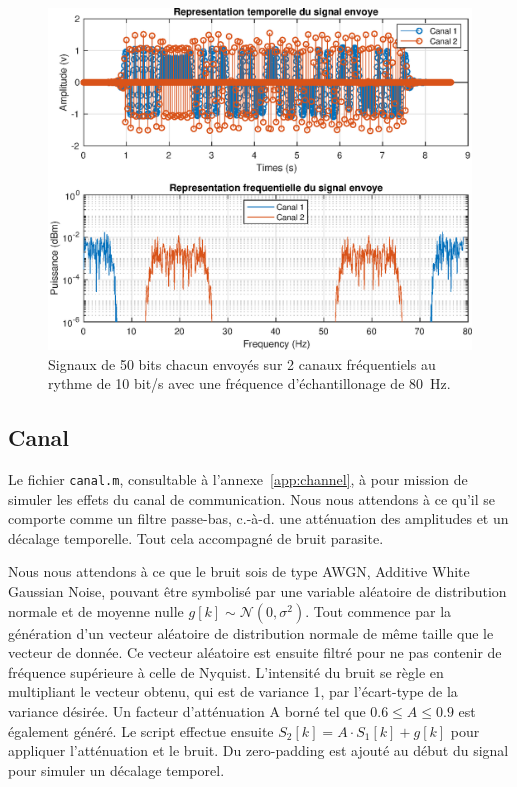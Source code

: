 \documentclass[10pt, oneside, a4paper]{article}
\begin{document}
\begin{figure}[p]
	\centering
	\includegraphics[height=0.45\textheight]{eps/sender.eps}
	\caption{Signaux de 50 bits chacun envoyés sur 2 canaux fréquentiels au rythme de 10 bit/s
			 avec une fréquence d'échantillonage de \SI{80}{\hertz}.}
	\label{fig:sender}
\end{figure}

\subsection{Canal}
Le fichier \texttt{canal.m}, consultable à l'annexe~\ref{app:channel}, à pour mission de simuler les effets du canal de communication.
Nous nous attendons à ce qu'il se comporte comme un filtre passe-bas, c.-à-d. une atténuation des amplitudes et un décalage temporelle.
Tout cela accompagné de bruit parasite.

Nous nous attendons à ce que le bruit sois de type AWGN, Additive White Gaussian Noise, pouvant être symbolisé par une variable aléatoire de distribution normale et de moyenne nulle $g[k]\sim\mathcal{N}(0,\sigma^2)$.
Tout commence par la génération d'un vecteur aléatoire de distribution normale de même taille que le vecteur de donnée.
Ce vecteur aléatoire est ensuite filtré pour ne pas contenir de fréquence supérieure à celle de Nyquist.
L'intensité du bruit se règle en multipliant le vecteur obtenu, qui est de variance 1, par l'écart-type de la variance désirée.
Un facteur d'atténuation A borné tel que $\num{0.6} \leq A \leq \num{0.9}$ est également généré.
Le script effectue ensuite $S_2[k] = A \cdot S_1[k] + g[k]$ pour appliquer l'atténuation et le bruit.
Du \og{}zero-padding\fg{} est ajouté au début du signal pour simuler un décalage temporel.
\end{document}
